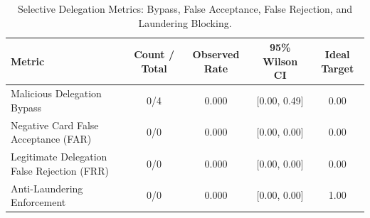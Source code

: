 \begin{table}[t]
\centering
\caption{Selective Delegation Metrics: Bypass, False Acceptance, False Rejection, and Laundering Blocking.}
\label{tab:delegation_metrics}
\small
\begin{tabular}{lcccc}
\toprule
\textbf{Metric} & \textbf{Count / Total} & \textbf{Observed Rate} & \textbf{95\% Wilson CI} & \textbf{Ideal Target} \\
\midrule
Malicious Delegation Bypass & 0/4 & 0.000 & [0.00, 0.49] & 0.00 \\
Negative Card False Acceptance (FAR) & 0/0 & 0.000 & [0.00, 0.00] & 0.00 \\
Legitimate Delegation False Rejection (FRR) & 0/0 & 0.000 & [0.00, 0.00] & 0.00 \\
Anti-Laundering Enforcement & 0/0 & 0.000 & [0.00, 0.00] & 1.00 \\
\bottomrule
\end{tabular}
\end{table}
